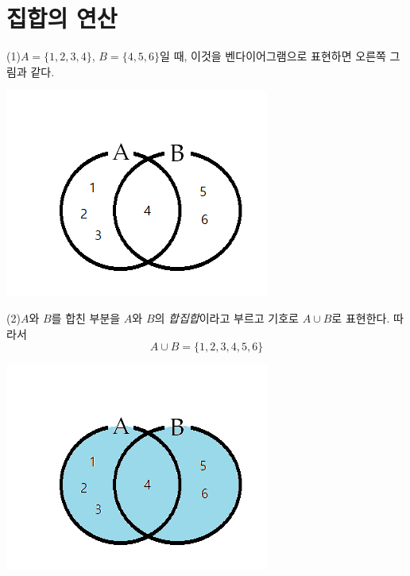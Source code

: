 \documentclass{oblivoir}
\begin{document}
\section{집합의 연산}
%
\begin{minipage}{0.65\textwidth}\label{operations1}
(1)\:\(A=\{1,2,3,4\}\), \(B=\{4,5,6\}\)일 때, 이것을 벤다이어그램으로 표현하면 오른쪽 그림과 같다.
\end{minipage}
\begin{minipage}{0.3\textwidth}
\begin{center}
\includegraphics[width=\textwidth]{operations_1-1}
\end{center}
\end{minipage}

\noindent
\begin{minipage}{0.65\textwidth}
(2)\:\(A\)와 \(B\)를 합친 부분을
\(A\)와 \(B\)의 \emph{합집합}이라고 부르고 기호로 \(A\cup B\)로 표현한다.
따라서
\[A\cup B=\{1,2,3,4,5,6\}\]
\end{minipage}
\begin{minipage}{0.3\textwidth}
\begin{center}
\includegraphics[width=\textwidth]{operations_1-2}
\end{center}
\end{minipage}
\end{document}
